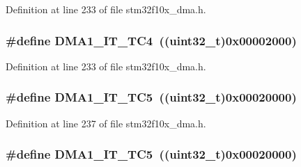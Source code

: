 Definition at line 233 of file stm32f10x\+\_\+dma.\+h.

\subsubsection[{\texorpdfstring{D\+M\+A1\+\_\+\+I\+T\+\_\+\+T\+C4}{DMA1_IT_TC4}}]{\setlength{\rightskip}{0pt plus 5cm}\#define D\+M\+A1\+\_\+\+I\+T\+\_\+\+T\+C4~(({\bf uint32\+\_\+t})0x00002000)}\hypertarget{group___d_m_a__interrupts__definition_ga4f6dd1c5092ca262f38c8bb8a7dc2986}{}\label{group___d_m_a__interrupts__definition_ga4f6dd1c5092ca262f38c8bb8a7dc2986}


Definition at line 233 of file stm32f10x\+\_\+dma.\+h.

\subsubsection[{\texorpdfstring{D\+M\+A1\+\_\+\+I\+T\+\_\+\+T\+C5}{DMA1_IT_TC5}}]{\setlength{\rightskip}{0pt plus 5cm}\#define D\+M\+A1\+\_\+\+I\+T\+\_\+\+T\+C5~(({\bf uint32\+\_\+t})0x00020000)}\hypertarget{group___d_m_a__interrupts__definition_gaf916fe8154ad4a956eec66ecfe0e7e36}{}\label{group___d_m_a__interrupts__definition_gaf916fe8154ad4a956eec66ecfe0e7e36}


Definition at line 237 of file stm32f10x\+\_\+dma.\+h.

\subsubsection[{\texorpdfstring{D\+M\+A1\+\_\+\+I\+T\+\_\+\+T\+C5}{DMA1_IT_TC5}}]{\setlength{\rightskip}{0pt plus 5cm}\#define D\+M\+A1\+\_\+\+I\+T\+\_\+\+T\+C5~(({\bf uint32\+\_\+t})0x00020000)}\hypertarget{group___d_m_a__interrupts__definition_gaf916fe8154ad4a956eec66ecfe0e7e36}{}\label{group___d_m_a__interrupts__definition_gaf916fe8154ad4a956eec66ecfe0e7e36}


